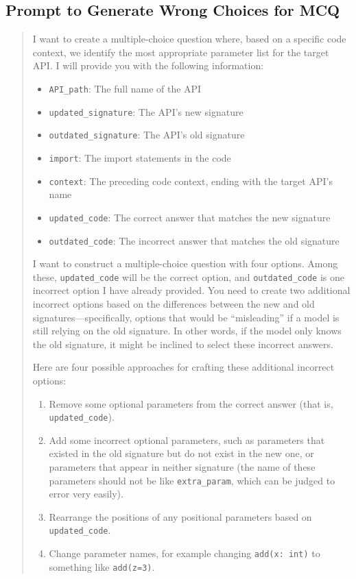 \subsection{Prompt to Generate Wrong Choices for MCQ}
\begin{tcolorbox}[breakable, colback=gray!5!white,width=\linewidth, left=-3mm, right=-3mm, top=1mm, bottom=1mm, center]
\begin{quote}
\small
{
I want to create a multiple-choice question where, based on a specific code context, we identify the most appropriate parameter list for the target API. I will provide you with the following information:
\begin{itemize}
    \item \texttt{API\_path}: The full name of the API
    \item \texttt{updated\_signature}: The API's new signature
    \item \texttt{outdated\_signature}: The API's old signature
    \item \texttt{import}: The import statements in the code
    \item \texttt{context}: The preceding code context, ending with the target API's name
    \item \texttt{updated\_code}: The correct answer that matches the new signature
    \item \texttt{outdated\_code}: The incorrect answer that matches the old signature
\end{itemize}
I want to construct a multiple-choice question with four options. Among these, \texttt{updated\_code} will be the correct option, and \texttt{outdated\_code} is one incorrect option I have already provided. You need to create two additional incorrect options based on the differences between the new and old signatures—specifically, options that would be “misleading” if a model is still relying on the old signature. In other words, if the model only knows the old signature, it might be inclined to select these incorrect answers.

Here are four possible approaches for crafting these additional incorrect options:

\begin{enumerate}
    \item Remove some optional parameters from the correct answer (that is, \texttt{updated\_code}).
    \item Add some incorrect optional parameters, such as parameters that existed in the old signature but do not exist in the new one, or parameters that appear in neither signature (the name of these parameters should not be like \texttt{extra\_param}, which can be judged to error very easily).
    \item Rearrange the positions of any positional parameters based on \texttt{updated\_code}.
    \item Change parameter names, for example changing \texttt{add(x: int)} to something like \texttt{add(z=3)}.
\end{enumerate}

}
\end{quote}
\end{tcolorbox}
